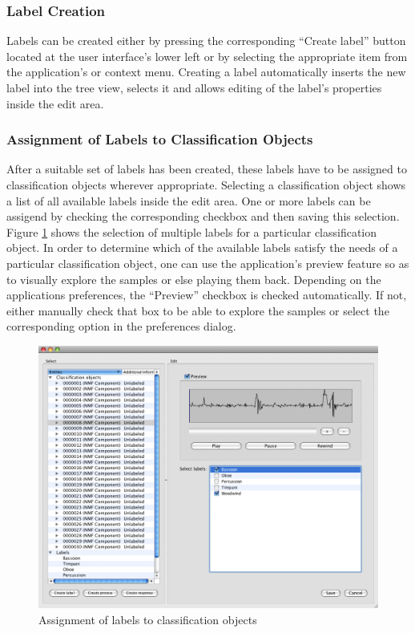 \subsubsection{Label Creation}

Labels can be created either by pressing the corresponding ``Create label''
button located at the user interface's lower left or by selecting the
appropriate item from the application's or context menu. Creating a label
automatically inserts the new label into the tree view, selects it and allows
editing of the label's properties inside the edit area.


\subsubsection{Assignment of Labels to Classification Objects}

After a suitable set of labels has been created, these labels have to be
assigned to classification objects wherever appropriate. Selecting a
classification object shows a list of all available labels inside the edit
area. One or more labels can be assigend by checking the corresponding checkbox
and then saving this selection. Figure \ref{figure:LabelAssignment} shows the
selection of multiple labels for a particular classification object.  In order
to determine which of the available labels satisfy the needs of a particular
classification object, one can use the application's preview feature so as to
visually explore the samples or else playing them back. Depending on the
applications preferences, the ``Preview'' checkbox is checked automatically. If
not, either manually check that box to be able to explore the samples or select
the corresponding option in the preferences dialog.

\begin{figure}
    \includegraphics[width=\textwidth]{images/LabelAssignment.png}
    \caption{%
        \label{figure:LabelAssignment}%
        Assignment of labels to classification objects
    }
\end{figure}

